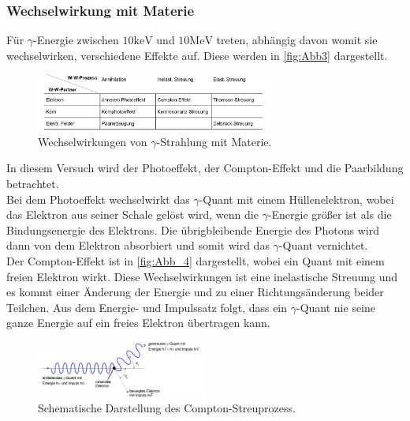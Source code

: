 \subsubsection{Wechselwirkung mit Materie}
\label{subsub:Wechselwirkung}
Für $\gamma$-Energie zwischen $10\si{\kilo\eV}$ und $10\si{\mega\eV}$ treten, abhängig davon womit sie wechselwirken,
verschiedene Effekte auf. Diese werden in \autoref{fig:Abb3} dargestellt.
\begin{figure}[H]
    \centering
    \includegraphics[width=0.7\textwidth]{build/Abb_3.png}
    \caption {Wechselwirkungen von $\gamma$-Strahlung mit Materie\cite[233]{V704}.}
    \label{fig:Abb3}
\end{figure}
In diesem Versuch wird der Photoeffekt, der Compton-Effekt und die Paarbildung betrachtet.\\
Bei dem Photoeffekt wechselwirkt das $\gamma$-Quant mit einem Hüllenelektron, wobei das Elektron aus seiner Schale gelöst wird, wenn die 
$\gamma$-Energie größer ist als die Bindungsenergie des Elektrons.
Die übrigbleibende Energie des Photons wird dann von dem Elektron absorbiert und somit wird das $\gamma$-Quant vernichtet.\\
Der Compton-Effekt ist in \autoref{fig:Abb_4} dargestellt, wobei  ein Quant mit einem freien Elektron wirkt.
Diese Wechselwirkungen ist eine inelastische Streuung und es kommt einer Änderung der Energie und zu einer Richtungsänderung beider Teilchen.
Aus dem Energie- und Impulssatz folgt, dass ein $\gamma$-Quant nie seine ganze Energie auf ein freies Elektron übertragen kann.

\begin{figure}[H]
    \centering
    \includegraphics[width=0.5\textwidth]{build/Abb_4.png}
    \caption {Schematische Darstellung des Compton-Streuprozess\cite[234]{V704}.}
    \label{fig:Abb_4}
\end{figure}

